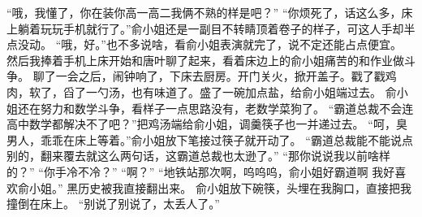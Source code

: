“哦，我懂了，你在装你高一高二我俩不熟的样是吧？”
“你烦死了，话这么多，床上躺着玩玩手机就行了。”俞小姐还是一副目不转睛顶着卷子的样子，可这人手却半点没动。
“哦，好。”也不多说啥，看俞小姐表演就完了，说不定还能占点便宜。
然后我捧着手机上床开始和唐叶聊了起来，看着床边上的俞小姐痛苦的和作业做斗争。
聊了一会之后，闹钟响了，下床去厨房。开门关火，掀开盖子。戳了戳鸡肉，软了，舀了一勺汤，也有味道了。盛了一碗加点盐，给俞小姐端过去。
俞小姐还在努力和数学斗争，看样子一点思路没有，老数学菜狗了。
“霸道总裁不会连高中数学都解决不了吧？”把鸡汤端给俞小姐，调羹筷子也一并递过去。
“呵，臭男人，乖乖在床上等着。”俞小姐放下笔接过筷子就开动了。
“霸道总裁能不能说点别的，翻来覆去就这么两句话，这霸道总裁也太逊了。”
“那你说说我以前啥样的？”
“你手冷不冷？”
“啊？”
“地铁站那次啊，呜呜呜，俞小姐好霸道啊 我好喜欢俞小姐。”
黑历史被我直接翻出来。
俞小姐放下碗筷，头埋在我胸口，直接把我撞倒在床上。
“别说了别说了，太丢人了。”

